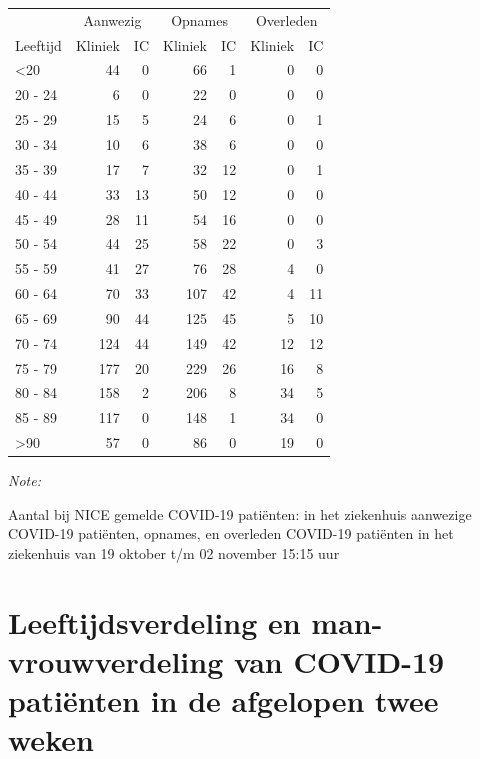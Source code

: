 \documentclass[
  english,
  man,floatsintext]{apa6}
\begin{document}
\begin{table}
\centering\begingroup\fontsize{10}{12}\selectfont

\begin{threeparttable}
\begin{tabular}{lrrrrrr}
\toprule
\multicolumn{1}{c}{ } & \multicolumn{2}{c}{Aanwezig} & \multicolumn{2}{c}{Opnames} & \multicolumn{2}{c}{Overleden} \\
\cmidrule(l{3pt}r{3pt}){2-3} \cmidrule(l{3pt}r{3pt}){4-5} \cmidrule(l{3pt}r{3pt}){6-7}
Leeftijd & Kliniek & IC & Kliniek & IC & Kliniek & IC\\
\midrule
<20 & 44 & 0 & 66 & 1 & 0 & 0\\
20 - 24 & 6 & 0 & 22 & 0 & 0 & 0\\
25 - 29 & 15 & 5 & 24 & 6 & 0 & 1\\
30 - 34 & 10 & 6 & 38 & 6 & 0 & 0\\
35 - 39 & 17 & 7 & 32 & 12 & 0 & 1\\
40 - 44 & 33 & 13 & 50 & 12 & 0 & 0\\
45 - 49 & 28 & 11 & 54 & 16 & 0 & 0\\
50 - 54 & 44 & 25 & 58 & 22 & 0 & 3\\
55 - 59 & 41 & 27 & 76 & 28 & 4 & 0\\
60 - 64 & 70 & 33 & 107 & 42 & 4 & 11\\
65 - 69 & 90 & 44 & 125 & 45 & 5 & 10\\
70 - 74 & 124 & 44 & 149 & 42 & 12 & 12\\
75 - 79 & 177 & 20 & 229 & 26 & 16 & 8\\
80 - 84 & 158 & 2 & 206 & 8 & 34 & 5\\
85 - 89 & 117 & 0 & 148 & 1 & 34 & 0\\
>90 & 57 & 0 & 86 & 0 & 19 & 0\\
\bottomrule
\end{tabular}
\begin{tablenotes}
\item \textit{Note: } 
\item Aantal bij NICE gemelde COVID-19 patiënten: in het ziekenhuis aanwezige COVID-19 patiënten, opnames, en overleden COVID-19 patiënten in het ziekenhuis van 19 oktober t/m 02 november 15:15 uur
\end{tablenotes}
\end{threeparttable}
\endgroup{}
\end{table}

\newpage

\hypertarget{leeftijdsverdeling-en-man-vrouwverdeling-van-covid-19-patiuxebnten-in-de-afgelopen-twee-weken}{%
\section{Leeftijdsverdeling en man-vrouwverdeling van COVID-19 patiënten in de afgelopen twee weken}\label{leeftijdsverdeling-en-man-vrouwverdeling-van-covid-19-patiuxebnten-in-de-afgelopen-twee-weken}}
\end{document}
